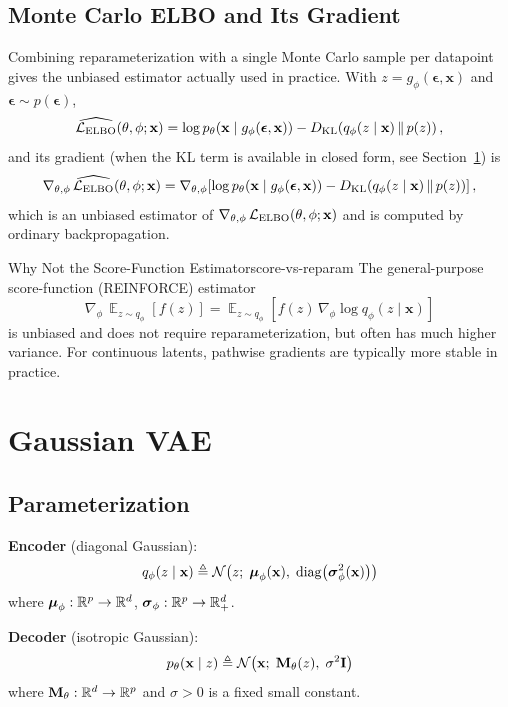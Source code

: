 \documentclass[11pt,a4paper]{article}
\newcommand{\wh}{\widehat}
\DeclareMathOperator*{\E}{\mathbb{E}}
\DeclareMathOperator{\diag}{diag}
\newcommand{\bx}{\mathbf{x}} \newcommand{\by}{\mathbf{y}}
\newcommand{\bmu}{\boldsymbol{\mu}}
\newcommand{\bsigma}{\boldsymbol{\sigma}}
\newcommand{\beps}{\boldsymbol{\epsilon}}
\newcommand{\KL}[2]{D_{\mathrm{KL}}\!\left(#1\,\|\,#2\right)}
\newcommand{\elbo}{\cL_{\mathrm{ELBO}}}
\begin{document}
\subsection{Monte Carlo ELBO and Its Gradient}

Combining reparameterization with a single Monte Carlo sample per datapoint gives the unbiased estimator actually used in practice. With $z=g_\phi(\beps,\bx)$ and $\beps\sim p(\beps)$,
\[
    \wh{\elbo}(\theta,\phi;\bx)
    = \log p_\theta\!\left(\bx\mid g_\phi(\beps,\bx)\right)
      - \KL{q_\phi(z\mid \bx)}{p(z)},
\]
and its gradient (when the KL term is available in closed form, see Section~\ref{sec:gaussian-vae}) is
\[
    \nabla_{\theta,\phi}\,\wh{\elbo}(\theta,\phi;\bx)
    = \nabla_{\theta,\phi}\!\left[
        \log p_\theta\!\left(\bx\mid g_\phi(\beps,\bx)\right)
        - \KL{q_\phi(z\mid \bx)}{p(z)}
    \right],
\]
which is an unbiased estimator of $\nabla_{\theta,\phi}\,\elbo(\theta,\phi;\bx)$ and is computed by ordinary backpropagation.

\begin{remark}{Why Not the Score-Function Estimator}{score-vs-reparam}
The general-purpose score-function (REINFORCE) estimator
\[
    \nabla_\phi\,\E_{z\sim q_\phi}\!\left[f(z)\right]
    = \E_{z\sim q_\phi}\!\left[f(z)\,\nabla_\phi\log q_\phi(z\mid \bx)\right]
\]
is unbiased and does not require reparameterization, but often has much higher variance. For continuous latents, pathwise gradients are typically more stable in practice.
\end{remark}

\section{Gaussian VAE}\label{sec:gaussian-vae}

\subsection{Parameterization}

\textbf{Encoder} (diagonal Gaussian):
\[
    q_\phi(z\mid \bx) \triangleq \cN\!\left(z;\;\bmu_\phi(\bx),\;\diag\!\left(\bsigma^2_\phi(\bx)\right)\right)
\]
where $\bmu_\phi:\R^p\to\R^d$, $\bsigma_\phi:\R^p\to\R^d_+$.

\medskip
\textbf{Decoder} (isotropic Gaussian):
\[
    p_\theta(\bx\mid z) \triangleq \cN\!\left(\bx;\;\mathbf{M}_\theta(z),\;\sigma^2\mathbf{I}\right)
\]
where $\mathbf{M}_\theta:\mathbb{R}^d\to\mathbb{R}^p$ and $\sigma>0$ is a fixed small constant.
\end{document}
